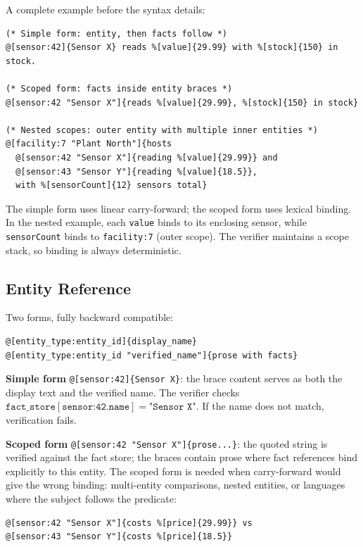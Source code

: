 \documentclass[11pt,a4paper]{article}
\begin{document}
\noindent A complete example before the syntax details:

\begin{lstlisting}
(* Simple form: entity, then facts follow *)
@[sensor:42]{Sensor X} reads %[value]{29.99} with %[stock]{150} in stock.

(* Scoped form: facts inside entity braces *)
@[sensor:42 "Sensor X"]{reads %[value]{29.99}, %[stock]{150} in stock}

(* Nested scopes: outer entity with multiple inner entities *)
@[facility:7 "Plant North"]{hosts
  @[sensor:42 "Sensor X"]{reading %[value]{29.99}} and
  @[sensor:43 "Sensor Y"]{reading %[value]{18.5}},
  with %[sensorCount]{12} sensors total}
\end{lstlisting}

\noindent The simple form uses linear carry-forward; the scoped form uses lexical binding. In the nested example, each \texttt{value} binds to its enclosing sensor, while \texttt{sensorCount} binds to \texttt{facility:7} (outer scope). The verifier maintains a scope stack, so binding is always deterministic.

\subsection{Entity Reference}

Two forms, fully backward compatible:

\begin{lstlisting}
@[entity_type:entity_id]{display_name}
@[entity_type:entity_id "verified_name"]{prose with facts}
\end{lstlisting}

\noindent \textbf{Simple form} \texttt{@[sensor:42]\{Sensor X\}}: the brace content serves as both the display text and the verified name. The verifier checks $\texttt{fact\_store}[\texttt{sensor:42.name}] = \texttt{"Sensor X"}$. If the name does not match, verification fails.

\textbf{Scoped form} \texttt{@[sensor:42 "Sensor X"]\{prose...\}}: the quoted string is verified against the fact store; the braces contain prose where fact references bind explicitly to this entity. The scoped form is needed when carry-forward would give the wrong binding: multi-entity comparisons, nested entities, or languages where the subject follows the predicate:

\begin{lstlisting}
@[sensor:42 "Sensor X"]{costs %[price]{29.99}} vs
@[sensor:43 "Sensor Y"]{costs %[price]{18.5}}
\end{lstlisting}
\end{document}

